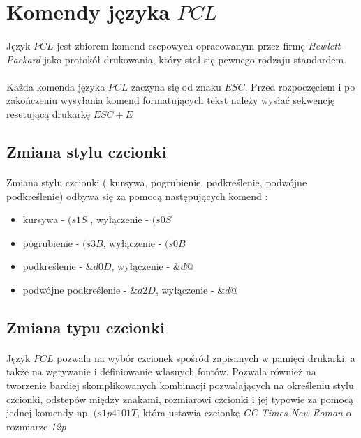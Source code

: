 \documentclass[wide,a4paper,titlepage,12pt] {article}
\begin{document}
\section{Komendy języka $PCL$}
\paragraph{}
Język $PCL$ jest zbiorem komend escpowych opracowanym przez firmę \textit{Hewlett-Packard} jako protokół drukowania, który stał się pewnego rodzaju standardem.
\paragraph{}
Każda komenda języka $PCL$ zaczyna się od znaku $ESC$. Przed rozpoczęciem i po zakończeniu wysyłania komend formatujących tekst należy wysłać sekwencję resetującą drukarkę $ESC+E$
\subsection{Zmiana stylu czcionki}
\paragraph{}
Zmiana stylu czcionki ( kursywa, pogrubienie, podkreślenie, podwójne podkreślenie) odbywa się za pomocą następujących komend :
\begin{itemize}
	\item kursywa - $(s1S$ ,  wyłączenie - $(s0S$  
	\item pogrubienie - $(s3B$, wyłączenie - $(s0B$
	\item podkreślenie - $\&d0D$, wyłączenie - $\&d@$
	\item podwójne podkreślenie - $\&d2D$, wyłączenie - $\&d@$
\end{itemize} 

\subsection{Zmiana typu czcionki}
\paragraph{}
Język $PCL$ pozwala na wybór czcionek spośród zapisanych w pamięci drukarki, a także na wgrywanie i definiowanie własnych fontów. Pozwala również na tworzenie bardiej skomplikowanych kombinacji pozwalających na określeniu stylu czcionki, odstepów między znakami, rozmiarowi czcionki i jej typowie za pomocą jednej komendy np. $(s1p4101T$, która ustawia czcionkę \textit{GC Times New Roman} o rozmiarze \textit{12p} 
\end{document}
